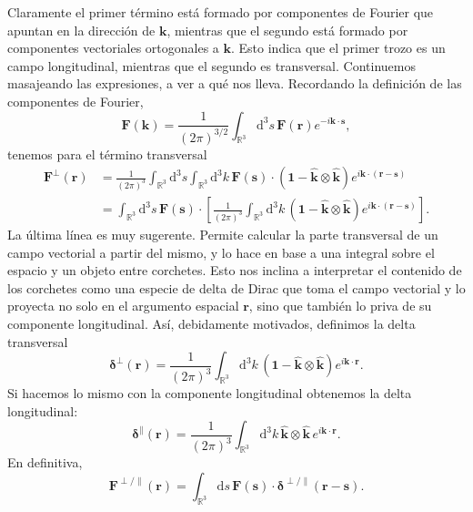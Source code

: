 Claramente el primer término está formado por componentes de Fourier que apuntan en la dirección de \(\mathbf{k}\), mientras que el segundo está formado por componentes vectoriales ortogonales a \(\mathbf{k}\). Esto indica que el primer trozo es un campo longitudinal, mientras que el segundo es transversal. Continuemos masajeando las expresiones, a ver a qué nos lleva. Recordando la definición de las componentes de Fourier,
\begin{equation}
    \mathbf{F}(\mathbf{k}) = \frac{1}{(2\pi)^{3/2}} \int_{\mathbb{R}^3}\mathrm{d}^3s\, \mathbf{F}(\mathbf{r}) e^{-i\mathbf{k}\cdot\mathbf{s}},
\end{equation}
tenemos para el término transversal
\begin{align*}
    \mathbf{F}^\perp(\mathbf{r}) &= \frac{1}{(2\pi)^{3}} \int_{\mathbb{R}^3}\mathrm{d}^3s \int_{\mathbb{R}^3}\mathrm{d}^3k\, \mathbf{F}(\mathbf{s}) \cdot \left( \mathbf{1} - \hat{\mathbf{k}}\otimes \hat{\mathbf{k}}\right) e^{i\mathbf{k}\cdot (\mathbf{r}-\mathbf{s})}\\
    &= \int_{\mathbb{R}^3}\mathrm{d}^3s\, \mathbf{F}(\mathbf{s})\cdot \left[\frac{1}{(2\pi)^{3}}\int_{\mathbb{R}^3}\mathrm{d}^3k\, \left( \mathbf{1} - \hat{\mathbf{k}}\otimes \hat{\mathbf{k}}\right) e^{i\mathbf{k}\cdot (\mathbf{r}-\mathbf{s})}\right].
\end{align*}
La última línea es muy sugerente. Permite calcular la parte transversal de un campo vectorial a partir del mismo, y lo hace en base a una integral sobre el espacio y un objeto entre corchetes. Esto nos inclina a interpretar el contenido de los corchetes como una especie de delta de Dirac que toma el campo vectorial y lo proyecta no solo en el argumento espacial \(\mathbf{r}\), sino que también lo priva de su componente longitudinal. Así, debidamente motivados, definimos la delta transversal
\begin{equation}
    \label{eq.1-delta_transversal}
    \boldsymbol{\delta}^\perp(\mathbf{r}) = \frac{1}{(2\pi)^{3}}\int_{\mathbb{R}^3}\mathrm{d}^3k\, \left( \mathbf{1} - \hat{\mathbf{k}}\otimes \hat{\mathbf{k}}\right) e^{i\mathbf{k}\cdot \mathbf{r}}.
\end{equation}
Si hacemos lo mismo con la componente longitudinal obtenemos la delta longitudinal:
\begin{equation}
    \label{eq.1-delta_longitudinal}
    \boldsymbol{\delta}^\parallel(\mathbf{r}) = \frac{1}{(2\pi)^{3}}\int_{\mathbb{R}^3}\mathrm{d}^3k\, \hat{\mathbf{k}}\otimes \hat{\mathbf{k}}\, e^{i\mathbf{k}\cdot \mathbf{r}}.
\end{equation}
En definitiva,
\begin{equation}
    \mathbf{F}^{\perp/\parallel}(\mathbf{r}) = \int_{\mathbb{R}^3}\mathrm{d}s\, \mathbf{F}(\mathbf{s})\cdot \boldsymbol{\delta}^{\perp/\parallel}(\mathbf{r}-\mathbf{s}).
\end{equation} 


